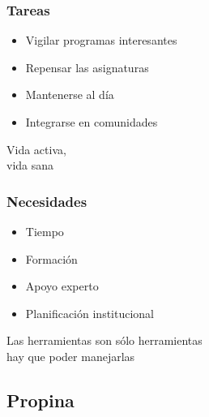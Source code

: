 \documentclass[17pt,aspectratio=169]{beamer}
\renewcommand{\secimage}{figs/bookpages}
\newcommand{\secimage}{figs/bookpages}
\begin{document}

\begin{frame}
\frametitle{Tareas}

\begin{itemize}
\item Vigilar programas interesantes
\item Repensar las asignaturas
\item Mantenerse al día
\item Integrarse en comunidades
\end{itemize}

\begin{flushright}
  Vida activa, \\
  vida sana \\
\end{flushright}
\end{frame}


\begin{frame}
\frametitle{Necesidades}

\begin{itemize}
\item Tiempo
\item Formación
\item Apoyo experto
\item Planificación institucional
\end{itemize}

\begin{flushright}
  Las herramientas son sólo herramientas \\
  hay que poder manejarlas \\
\end{flushright}
\end{frame}


\renewcommand{\secimage}{figs/tipjar}
{\bf
  \textcolor[rgb]{1,1,1}{
    \section{Propina}
  }
}

\end{document}

